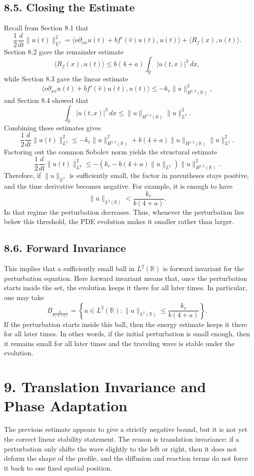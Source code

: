 \documentclass[11pt]{article}
\theoremstyle{definition}
\theoremstyle{remark}
\begin{document}
\subsection*{8.5. Closing the Estimate}
Recall from Section 8.1 that
\[
\frac12\frac{d}{dt}\|u(t)\|_{L^2}^2
=
\langle \nu\partial_{xx}u(t)+bf'(\hat v)u(t),u(t)\rangle
+
\langle R_f(x),u(t)\rangle.
\]
Section 8.2 gave the remainder estimate
\[
\langle R_f(x),u(t)\rangle
\leq
b(4+a)\int_{\mathbb R}|u(t,x)|^3\,dx,
\]
while Section 8.3 gave the linear estimate
\[
\langle \nu\partial_{xx}u(t)+bf'(\hat v)u(t),u(t)\rangle
\leq
-k_r\|u\|_{H^{1,2}(\mathbb R)}^2,
\]
and Section 8.4 showed that
\[
\int_{\mathbb R}|u(t,x)|^3\,dx
\leq
\|u\|_{H^{1,2}(\mathbb R)}\|u\|_{L^2}^2.
\]
Combining these estimates gives
\[
\frac12\frac{d}{dt}\|u(t)\|_{L^2}^2
\leq
-k_r\|u\|_{H^{1,2}(\mathbb R)}^2
+
b(4+a)\|u\|_{H^{1,2}(\mathbb R)}\|u\|_{L^2}^2.
\]
Factoring out the common Sobolev norm yields the structural estimate
\[
\frac12\frac{d}{dt}\|u(t)\|_{L^2}^2
\leq
-\left(k_r-b(4+a)\|u\|_{L^2}\right)\|u\|_{H^{1,2}(\mathbb R)}^2.
\]
Therefore, if $\|u\|_{L^2}$ is sufficiently small, the factor in parentheses stays positive, and the time derivative becomes negative. For example, it is enough to have
\[
\|u\|_{L^2(\mathbb R)}<\frac{k_r}{b(4+a)}.
\]
In that regime the perturbation decreases. Thus, whenever the perturbation lies below this threshold, the PDE evolution makes it smaller rather than larger.

\subsection*{8.6. Forward Invariance}
This implies that a sufficiently small ball in $L^2(\mathbb R)$ is forward invariant for the perturbation equation. Here forward invariant means that, once the perturbation starts inside the set, the evolution keeps it there for all later times. In particular, one may take
\[
B_{\frac{k_r}{b(4+a)}}=\left\{u\in L^2(\mathbb R):\|u\|_{L^2(\mathbb R)}\leq \frac{k_r}{b(4+a)}\right\}.
\]
If the perturbation starts inside this ball, then the energy estimate keeps it there for all later times. In other words, if the initial perturbation is small enough, then it remains small for all later times and the traveling wave is stable under the evolution.

\section*{9. Translation Invariance and Phase Adaptation}
The previous estimate appears to give a strictly negative bound, but it is not yet the correct linear stability statement. The reason is translation invariance: if a perturbation only shifts the wave slightly to the left or right, then it does not deform the shape of the profile, and the diffusion and reaction terms do not force it back to one fixed spatial position.
\end{document}
